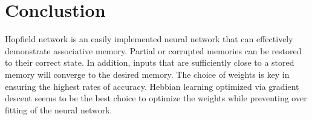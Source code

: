\section{Conclustion}
Hopfield network is an easily implemented neural network that can effectively demonstrate associative memory. Partial or corrupted memories can be restored to their correct state. In addition, inputs that are sufficiently close to a stored memory will converge to the desired memory. The choice of weights is key in ensuring the highest rates of accuracy. Hebbian learning optimized via gradient descent seems to be the best choice to optimize the weights while preventing over fitting of the neural network.\newpage